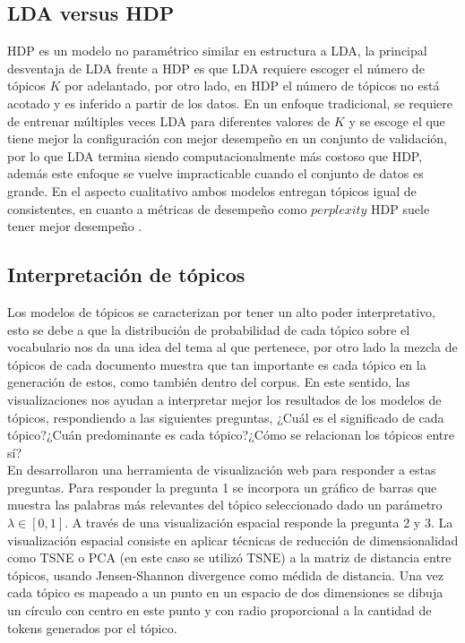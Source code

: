 \documentclass[letterpaper,12pt,oneside]{book} %
\begin{document}
\subsection{LDA versus HDP}

HDP es un modelo no paramétrico similar en estructura a LDA, la principal desventaja de LDA frente a HDP es que LDA requiere escoger el número de tópicos $K$ por adelantado, por otro lado, en HDP el número de tópicos no está acotado y es inferido a partir de los datos. En un enfoque tradicional, se requiere de entrenar múltiples veces LDA para diferentes valores de $K$ y se escoge el que tiene mejor la configuración con mejor desempeño en un conjunto de validación, por lo que LDA termina siendo computacionalmente más costoso que HDP, además este enfoque se vuelve impracticable cuando el conjunto de datos es grande. En el aspecto cualitativo ambos modelos entregan tópicos igual de consistentes, en cuanto a métricas de desempeño como $\textit{perplexity}$ HDP suele tener mejor desempeño \citep{teh2005sharing}.

\subsection{Interpretación de tópicos}

Los modelos de tópicos se caracterizan por tener un alto poder interpretativo, esto se debe a que la distribución de probabilidad de cada tópico sobre el vocabulario nos da una idea del tema al que pertenece, por otro lado la mezcla de tópicos de cada documento muestra que tan importante es cada tópico en la generación de estos, como también dentro del corpus. En este sentido, las visualizaciones nos ayudan a interpretar mejor los resultados de los modelos de tópicos, respondiendo a las siguientes preguntas, ¿Cuál es el significado de cada tópico?¿Cuán predominante es cada tópico?¿Cómo se relacionan los tópicos entre sí?\\

En \citep{sievert2014ldavis} desarrollaron una herramienta de visualización web para responder a estas preguntas. Para responder la pregunta 1 se incorpora un gráfico de barras que muestra las palabras más relevantes del tópico seleccionado dado un parámetro $\lambda \in [0,1]$. A través de una visualización espacial responde la pregunta 2 y 3. La visualización espacial consiste en aplicar técnicas de reducción de dimensionalidad como TSNE \citep{maaten2008visualizing} o PCA \citep{wold1987principal} (en este caso se utilizó TSNE) a la matriz de distancia entre tópicos, usando Jensen-Shannon divergence \citep{endres2003new} como médida de distancia. Una vez cada tópico es mapeado a un punto en un espacio de dos dimensiones se dibuja un círculo con centro en este punto y con radio proporcional a la cantidad de tokens generados por el tópico.\\
\end{document}
